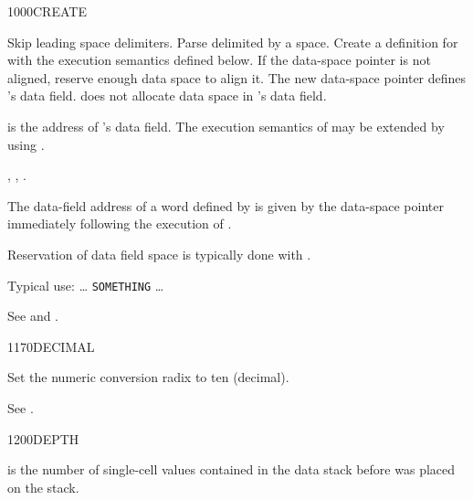 \begin{worddef}{1000}{CREATE}
\item {}

	Skip leading space delimiters. Parse  delimited by a
	space. Create a definition for  with the execution
	semantics defined below. If the data-space pointer is not
	aligned, reserve enough data space to align it. The new
	data-space pointer defines 's data field.
	 does not allocate data space in 's
	data field.

\execute[name]

	 is the address of 's data field.
	The execution semantics of  may be extended by
	using .

\see {},
	,
	.

	\begin{rationale} %
		The data-field address of a word defined by  is
		given by the data-space pointer immediately following the
		execution of .

		Reservation of data field space is typically done with
		.

		Typical use: {\ldots}
			 \texttt{SOMETHING} {\ldots}
	\end{rationale}

	\begin{testing} %
		See  and
			.
	\end{testing}
\end{worddef}


\begin{worddef}{1170}{DECIMAL}
\item \stack{}{}

	Set the numeric conversion radix to ten (decimal).

	\begin{testing} %
		See .
	\end{testing}
\end{worddef}


\begin{worddef}{1200}{DEPTH}
\item {}

	 is the number of single-cell values contained in the
	data stack before  was placed on the stack.

	\begin{testing} %
		 \\
		 \\
	\end{testing}
\end{worddef}


